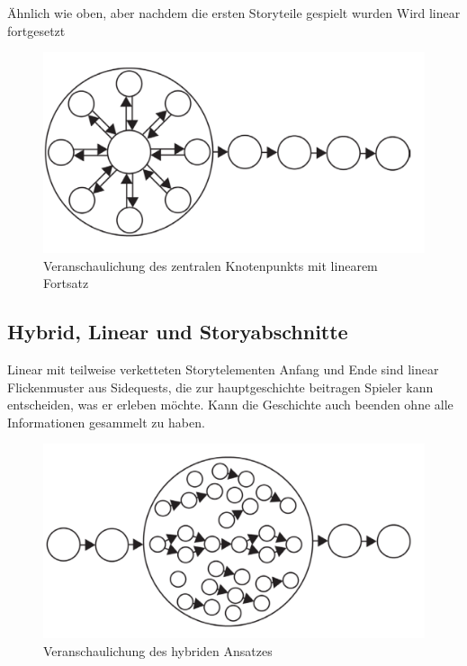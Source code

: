 Ähnlich wie oben, aber nachdem die ersten Storyteile gespielt wurden
Wird linear fortgesetzt


\begin{figure}[H]
    \centering
    \includegraphics[width=.8\textwidth]{files/story/storyZentralKnotenLinear}
    \caption{Veranschaulichung des zentralen Knotenpunkts mit linearem Fortsatz}
\end{figure} 


\subsection{Hybrid, Linear und Storyabschnitte} 

Linear mit teilweise verketteten Storytelementen
Anfang und Ende sind linear
Flickenmuster aus Sidequests, die zur hauptgeschichte beitragen
Spieler kann entscheiden, was er erleben möchte.
Kann die Geschichte auch beenden ohne alle Informationen gesammelt zu haben. \\

\begin{figure}[H]
    \centering
    \includegraphics[width=.8\textwidth]{files/story/storyTeile}
    \caption{Veranschaulichung des hybriden Ansatzes}
\end{figure} 


\cite[Seite 12]{Adams:1515529}